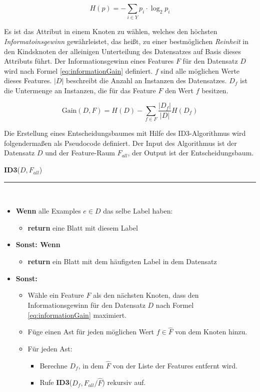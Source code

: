 \begin{equation}
H(p) = -\sum_{i \in Y} p_i \cdot \log_{2} p_i
\label{eq:entropy}
\end{equation}

Es ist das Attribut in einem Knoten zu wählen, welches den höchsten \emph{Informatoinsgewinn} gewährleistet, das heißt, zu einer bestmöglichen \emph{Reinheit} in den Kindsknoten der alleinigen Unterteilung des Datensatzes auf Basis dieses Attributs führt. Der Informationsgewinn eines Features $F$ für den Datensatz $D$ wird nach Formel \ref{eq:informationGain} definiert. $f$ sind alle möglichen Werte dieses Features. $|D|$ beschreibt die Anzahl an Instanzen des Datensatzes. $D_f$ ist die Untermenge an Instanzen, die für das Feature $F$ den Wert $f$ besitzen.\cite[S. 136 - 137]{machine_marsland}

\begin{equation}
\text{Gain}(D,F) = H(D) - \sum_{f \in F} \frac{|D_f|}{|D|} H(D_f)
\label{eq:informationGain}
\end{equation}

Die Erstellung eines Entscheidungsbaumes mit Hilfe des ID3-Algorithmus wird folgendermaßen als Pseudocode definiert. Der Input des Algorithmus ist der Datensatz $D$ und der Feature-Raum $F_{all}$, der Output ist der Entscheidungsbaum.\cite[S. 139]{machine_marsland}

\vspace{5mm}

\textbf{ID3}($D,F_{all}$) \noindent\rule{0.83\linewidth}{0.3pt} \\
\begin{itemize}
\item \textbf{Wenn} alle Examples $e \in D$ das selbe Label haben:
	\begin{itemize}
	\item \textbf{return} eine Blatt mit diesem Label
	\end{itemize}
\item \textbf{Sonst: Wenn} 
	\begin{itemize}
	\item \textbf{return} ein Blatt mit dem häufigsten Label in dem Datensatz
	\end{itemize}

\item \textbf{Sonst:} 
	\begin{itemize}
	\item Wähle ein Feature $\hat{F}$ als den nächsten Knoten, dass den Informationsgewinn für den Datensatz $D$ nach Formel \ref{eq:informationGain} maximiert.
	\item Füge einen Ast für jeden möglichen Wert $f \in \hat{F}$ von dem Knoten hinzu.
	\item Für jeden Ast:
	\begin{itemize}
		\item Berechne $D_f$, in dem $\hat{F}$ von der Liste der Features entfernt wird.
		\item Rufe \textbf{ID3}($D_f, F_{all} / \hat{F}$) rekursiv auf.
	\end{itemize}
	\end{itemize}
\end{itemize}

